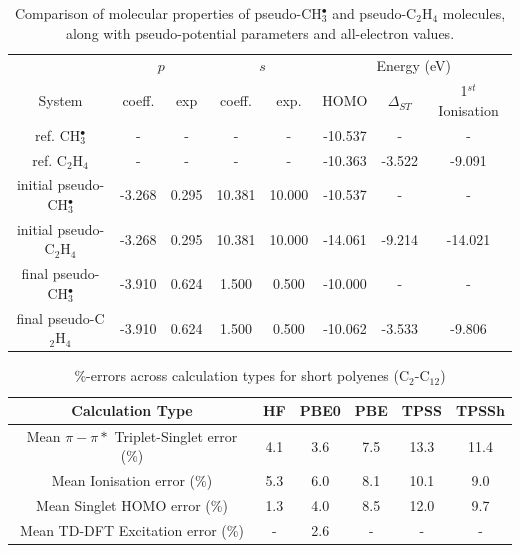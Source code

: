 \documentclass[12pt]{article}
\begin{document}
\begin{table}[h]
\caption{\label{table:potential_params} Comparison of molecular properties of pseudo-CH$^{\bullet}_{3}$ and pseudo-C$_{2}$H$_{4}$ molecules, along with pseudo-potential parameters and all-electron values.}
\begin{tabular}{c | c c c c | c c c}
\hline
 & \multicolumn{2}{c}{$p$} & \multicolumn{2}{c}{$s$} & \multicolumn{3}{|c}{Energy (eV)} \\
System & coeff. & exp & coeff. & exp. & HOMO & $\Delta_{ST}$ & 1$^{st}$ Ionisation \\
\hline
ref. CH$^{\bullet}_{3}$ & - & - & - & - & -10.537 & - & - \\
ref. C$_{2}$H$_{4}$ & - & - & - & - & -10.363 & -3.522 & -9.091 \\
\hline
initial pseudo-CH$^{\bullet}_{3}$ & -3.268 & 0.295 & 10.381 & 10.000 & -10.537 & - & - \\
initial pseudo-C$_{2}$H$_{4}$ & -3.268 & 0.295 & 10.381 & 10.000 & -14.061 & -9.214 & -14.021\\
\hline
final pseudo-CH$^{\bullet}_{3}$ & -3.910 & 0.624 & 1.500 & 0.500 & -10.000 & - & - \\
final pseudo-C$_{2}$H$_{4}$ & -3.910 & 0.624 & 1.500 & 0.500 & -10.062 & -3.533 & -9.806 \\
\hline
\end{tabular}
\end{table}


\newpage

\begin{table}[h]
\caption{\%-errors across calculation types for short polyenes (C\(_{2}\)-C\(_{12}\))}
\begin{tabular}{c c c c c c }
\hline
Calculation Type & HF & PBE0 & PBE & TPSS & TPSSh \\
\hline
Mean \(\pi - \pi*\) Triplet-Singlet error (\%) & 4.1 & 3.6 & 7.5 & 13.3 & 11.4 \\
Mean Ionisation error (\%) & 5.3 & 6.0 & 8.1 & 10.1 & 9.0 \\
Mean Singlet HOMO error (\%) & 1.3 & 4.0 & 8.5 & 12.0 & 9.7 \\
Mean TD-DFT Excitation error (\%) & - & 2.6 & - & - & - \\ 
\hline
\end{tabular}
\label{table:alkene_errors}
\end{table}

\newpage
\end{document}
